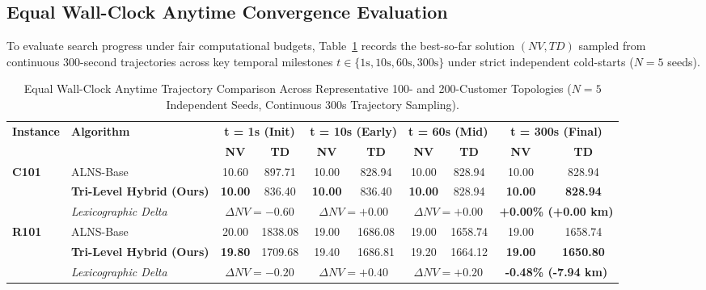 \documentclass{ieeeaccess}
\begin{document}
\subsection{Equal Wall-Clock Anytime Convergence Evaluation}
\label{sec:anytime_results}

To evaluate search progress under fair computational budgets, Table~\ref{tab:anytime_wallclock} records the best-so-far solution $(NV, TD)$ sampled from continuous 300-second trajectories across key temporal milestones $t \in \{1\text{s}, 10\text{s}, 60\text{s}, 300\text{s}\}$ under strict independent cold-starts ($N=5$ seeds).

\begin{table}[!t]
\caption{Equal Wall-Clock Anytime Trajectory Comparison Across Representative 100- and 200-Customer Topologies ($N=5$ Independent Seeds, Continuous 300s Trajectory Sampling).}
\label{tab:anytime_wallclock}
\centering
\scriptsize
\setlength{\tabcolsep}{3.5pt}
\begin{tabular*}{\textwidth}{@{\extracolsep{\fill}} ll cccccc cc @{}}
\toprule
\multirow{2}{*}{\textbf{Instance}} & \multirow{2}{*}{\textbf{Algorithm}} & \multicolumn{2}{c}{\textbf{t = 1s (Init)}} & \multicolumn{2}{c}{\textbf{t = 10s (Early)}} & \multicolumn{2}{c}{\textbf{t = 60s (Mid)}} & \multicolumn{2}{c}{\textbf{t = 300s (Final)}} \\
\cmidrule(lr){3-4} \cmidrule(lr){5-6} \cmidrule(lr){7-8} \cmidrule(lr){9-10}
 & & \textbf{NV} & \textbf{TD} & \textbf{NV} & \textbf{TD} & \textbf{NV} & \textbf{TD} & \textbf{NV} & \textbf{TD} \\
\midrule
\multirow{3}{*}{\textbf{C101}} & ALNS-Base & 10.60 & 897.71 & 10.00 & 828.94 & 10.00 & 828.94 & 10.00 & 828.94 \\
 & \textbf{Tri-Level Hybrid (Ours)} & \textbf{10.00} & 836.40 & \textbf{10.00} & 836.40 & \textbf{10.00} & 828.94 & \textbf{10.00} & \textbf{828.94} \\
 & \textit{Lexicographic Delta} & \multicolumn{2}{c}{$\Delta NV = -0.60$} & \multicolumn{2}{c}{$\Delta NV = +0.00$} & \multicolumn{2}{c}{$\Delta NV = +0.00$} & \multicolumn{2}{c}{\textbf{+0.00\% (+0.00 km)}} \\
\midrule
\multirow{3}{*}{\textbf{R101}} & ALNS-Base & 20.00 & 1838.08 & 19.00 & 1686.08 & 19.00 & 1658.74 & 19.00 & 1658.74 \\
 & \textbf{Tri-Level Hybrid (Ours)} & \textbf{19.80} & 1709.68 & 19.40 & 1686.81 & 19.20 & 1664.12 & \textbf{19.00} & \textbf{1650.80} \\
 & \textit{Lexicographic Delta} & \multicolumn{2}{c}{$\Delta NV = -0.20$} & \multicolumn{2}{c}{$\Delta NV = +0.40$} & \multicolumn{2}{c}{$\Delta NV = +0.20$} & \multicolumn{2}{c}{\textbf{-0.48\% (-7.94 km)}} \\

\end{tabular*}
\end{table}
\end{document}

